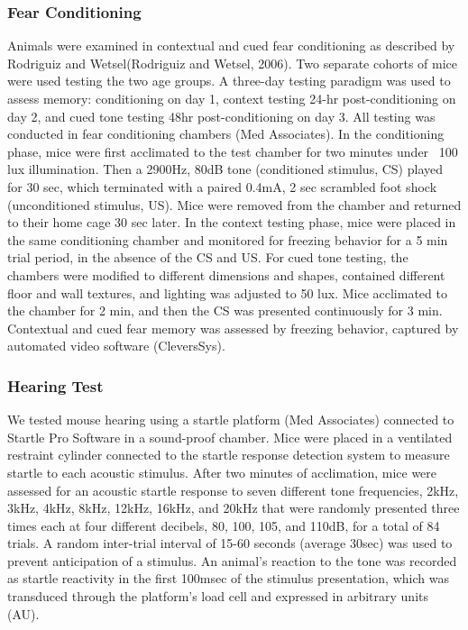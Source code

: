 \subsubsection{Fear Conditioning}
Animals were examined in contextual and cued fear
conditioning as described by Rodriguiz and Wetsel(Rodriguiz and Wetsel, 2006).
Two separate cohorts of mice were used testing the two age groups. A three-day
testing paradigm was used to assess memory: conditioning on day 1, context
testing 24-hr post-conditioning on day 2, and cued tone testing 48hr
post-conditioning on day 3. All testing was conducted in fear conditioning
chambers (Med Associates). In the conditioning phase, mice were first acclimated
to the test chamber for two minutes under ~100 lux illumination. Then a 2900Hz,
80dB tone (conditioned stimulus, CS) played for 30 sec, which terminated with a
paired 0.4mA, 2 sec scrambled foot shock (unconditioned stimulus, US). Mice were
removed from the chamber and returned to their home cage 30 sec later. In the
context testing phase, mice were placed in the same conditioning chamber and
monitored for freezing behavior for a 5 min trial period, in the absence of the
CS and US. For cued tone testing, the chambers were modified to different
dimensions and shapes, contained different floor and wall textures, and lighting
was adjusted to 50 lux. Mice acclimated to the chamber for 2 min, and then the
CS was presented continuously for 3 min.  Contextual and cued fear memory was
assessed by freezing behavior, captured by automated video software
(CleversSys).

\subsubsection{Hearing Test}
We tested mouse hearing using a startle platform
(Med Associates) connected to Startle Pro Software in a sound-proof chamber.
Mice were placed in a ventilated restraint cylinder connected to the startle
response detection system to measure startle to each acoustic stimulus. After
two minutes of acclimation, mice were assessed for an acoustic startle response
to seven different tone frequencies, 2kHz, 3kHz, 4kHz, 8kHz, 12kHz, 16kHz, and
20kHz that were randomly presented three times each at four different decibels,
80, 100, 105, and 110dB, for a total of 84 trials. A random inter-trial interval
of 15-60 seconds (average 30sec) was used to prevent anticipation of a stimulus.
An animal’s reaction to the tone was recorded as startle reactivity in the first
100msec of the stimulus presentation, which was transduced through the
platform’s load cell and expressed in arbitrary units (AU).  

